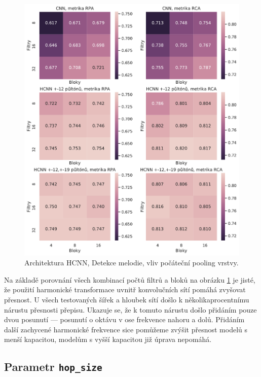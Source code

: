 \begin{figure}[h!]\centering
    \includegraphics[scale=0.55]{../img/figures/spectrogram_harmonic_stacking}
\caption{Architektura HCNN, Detekce melodie, vliv počáteční pooling vrstvy.}\label{obr:spectrogram_harmonic_stacking}
\end{figure}

Na základě porovnání všech kombinací počtů filtrů a bloků na obrázku \ref{obr:spectrogram_harmonic_stacking} je jisté, že použití harmonické transformace uvnitř konvolučních sítí pomáhá zvyšovat přesnost. U všech testovaných šířek a hloubek sítí došlo k několikaprocentnímu nárustu přesnosti přepisu. Ukazuje se, že k tomuto nárustu došlo přidáním pouze dvou posunutí --- posunutí o oktávu v ose frekvence nahoru a dolů. Přidáním další zachycené harmonické frekvence sice pomůžeme zvýšit přesnost modelů s menší kapacitou, modelům s vyšší kapacitou již úprava nepomáhá. 

\subsection{Parametr \texttt{hop\_size}}

